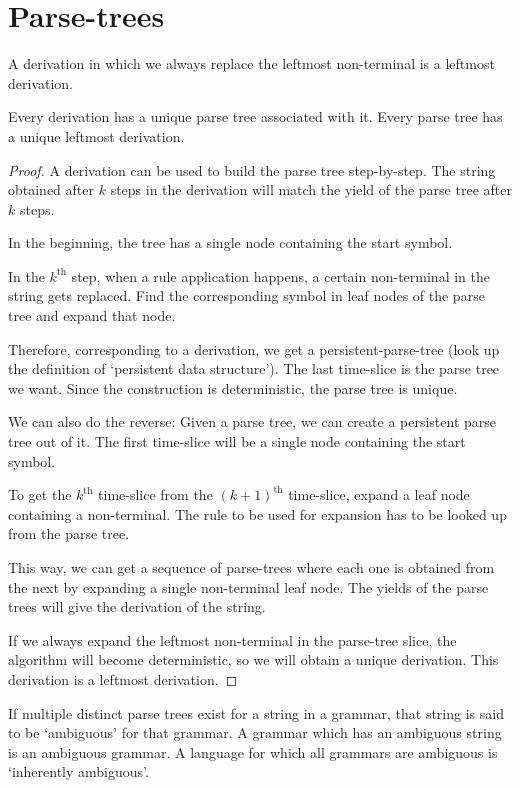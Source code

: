 \section{Parse-trees}

\begin{definition}
A derivation in which we always replace the leftmost non-terminal is a leftmost derivation.
\end{definition}
\begin{theorem}
Every derivation has a unique parse tree associated with it.
Every parse tree has a unique leftmost derivation.
\end{theorem}
\begin{proof}
A derivation can be used to build the parse tree step-by-step.
The string obtained after $k$ steps in the derivation will match
the yield of the parse tree after $k$ steps.

In the beginning, the tree has a single node containing the start symbol.

In the $k^{\textrm{th}}$ step, when a rule application happens,
a certain non-terminal in the string gets replaced.
Find the corresponding symbol in leaf nodes of the parse tree
and expand that node.

Therefore, corresponding to a derivation,
we get a persistent-parse-tree (look up the definition of `persistent data structure').
The last time-slice is the parse tree we want.
Since the construction is deterministic, the parse tree is unique.

We can also do the reverse:
Given a parse tree, we can create a persistent parse tree out of it.
The first time-slice will be a single node containing the start symbol.

To get the $k^{\textrm{th}}$ time-slice from the $(k+1)^{\textrm{th}}$ time-slice,
expand a leaf node containing a non-terminal.
The rule to be used for expansion has to be looked up from the parse tree.

This way, we can get a sequence of parse-trees where each one is obtained
from the next by expanding a single non-terminal leaf node.
The yields of the parse trees will give the derivation of the string.

If we always expand the leftmost non-terminal in the parse-tree slice,
the algorithm will become deterministic, so we will obtain a unique derivation.
This derivation is a leftmost derivation.
\end{proof}

\begin{definition}
If multiple distinct parse trees exist for a string in a grammar, that string is said to be `ambiguous' for that grammar.
A grammar which has an ambiguous string is an ambiguous grammar.
A language for which all grammars are ambiguous is `inherently ambiguous'.
\end{definition}

